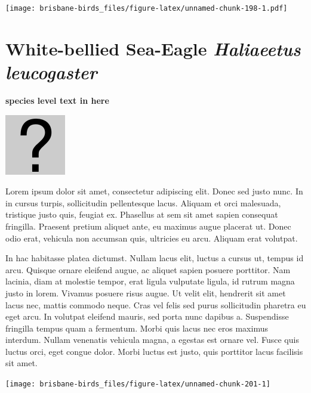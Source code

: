 \documentclass[]{book}
\let\origfigure\figure
\let\endorigfigure\endfigure
\renewenvironment{figure}[1][2] {
  \expandafter\origfigure\expandafter[H]
} {
  \endorigfigure
}
\begin{document}
\begin{figure}
\centering
\texttt{[image: brisbane-birds\_files/figure-latex/unnamed-chunk-198-1.pdf]}
\caption{\label{fig:unnamed-chunk-198}insert figure caption}
\end{figure}

\section{\texorpdfstring{White-bellied Sea-Eagle \emph{Haliaeetus
leucogaster}}{White-bellied Sea-Eagle Haliaeetus leucogaster}}\label{white-bellied-sea-eagle-haliaeetus-leucogaster}

\textbf{species level text in here}

\begin{figure}
\centering
\includegraphics{assets/missing.png}
\caption{No image for species}
\end{figure}

Lorem ipsum dolor sit amet, consectetur adipiscing elit. Donec sed justo
nunc. In in cursus turpis, sollicitudin pellentesque lacus. Aliquam et
orci malesuada, tristique justo quis, feugiat ex. Phasellus at sem sit
amet sapien consequat fringilla. Praesent pretium aliquet ante, eu
maximus augue placerat ut. Donec odio erat, vehicula non accumsan quis,
ultricies eu arcu. Aliquam erat volutpat.

In hac habitasse platea dictumst. Nullam lacus elit, luctus a cursus ut,
tempus id arcu. Quisque ornare eleifend augue, ac aliquet sapien posuere
porttitor. Nam lacinia, diam at molestie tempor, erat ligula vulputate
ligula, id rutrum magna justo in lorem. Vivamus posuere risus augue. Ut
velit elit, hendrerit sit amet lacus nec, mattis commodo neque. Cras vel
felis sed purus sollicitudin pharetra eu eget arcu. In volutpat eleifend
mauris, sed porta nunc dapibus a. Suspendisse fringilla tempus quam a
fermentum. Morbi quis lacus nec eros maximus interdum. Nullam venenatis
vehicula magna, a egestas est ornare vel. Fusce quis luctus orci, eget
congue dolor. Morbi luctus est justo, quis porttitor lacus facilisis sit
amet.

\begin{figure}
\texttt{[image: brisbane-birds\_files/figure-latex/unnamed-chunk-201-1]} \caption{insert figure caption}\label{fig:unnamed-chunk-201}
\end{figure}
\end{document}
